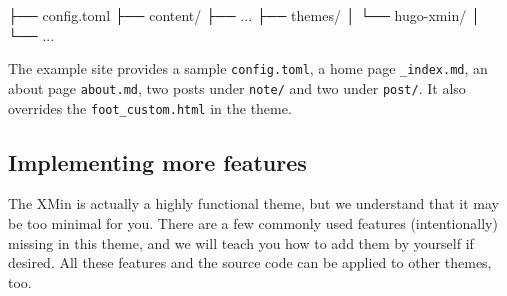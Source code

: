 \documentclass[12pt,]{krantz}
\makeatletter
\newenvironment{Shaded}{\begin{snugshade}}{\end{snugshade}}
\newcommand{\ExtensionTok}[1]{#1}
\newcommand{\NormalTok}[1]{#1}
\newenvironment{kframe}{%
\medskip{}
\setlength{\fboxsep}{.8em}
 \def\at@end@of@kframe{}%
 \ifinner\ifhmode%
  \def\at@end@of@kframe{\end{minipage}}%
  \begin{minipage}{\columnwidth}%
 \fi\fi%
 \def\FrameCommand##1{\hskip\@totalleftmargin \hskip-\fboxsep
 \colorbox{shadecolor}{##1}\hskip-\fboxsep
     \hskip-\linewidth \hskip-\@totalleftmargin \hskip\columnwidth}%
 \MakeFramed {\advance\hsize-\width
   \@totalleftmargin\z@ \linewidth\hsize
   \@setminipage}}%
 {\par\unskip\endMakeFramed%
 \at@end@of@kframe}
\renewenvironment{Shaded}{\begin{kframe}}{\end{kframe}}
\theoremstyle{definition}
\theoremstyle{definition}
\theoremstyle{definition}
\theoremstyle{remark}
\makeatother
\begin{document}
\begin{Shaded}
\begin{Highlighting}[]
\NormalTok{├── }\ExtensionTok{config.toml}
\NormalTok{├── }\ExtensionTok{content/}
\NormalTok{├── }\ExtensionTok{...}
\NormalTok{├── }\ExtensionTok{themes/}
\NormalTok{│   └── }\ExtensionTok{hugo-xmin/}
\NormalTok{│}
\NormalTok{└── }\ExtensionTok{...}
\end{Highlighting}
\end{Shaded}

The example site provides a sample \texttt{config.toml}, a home page
\texttt{\_index.md}, an about page \texttt{about.md}, two posts under
\texttt{note/} and two under \texttt{post/}. It also overrides the
\texttt{foot\_custom.html} in the theme.

\hypertarget{how-to}{%
\subsection{Implementing more features}\label{how-to}}

The XMin is actually a highly functional theme, but we understand that
it may be too minimal for you. There are a few commonly used features
(intentionally) missing in this theme, and we will teach you how to add
them by yourself if desired. All these features and the source code can
be applied to other themes, too.
\end{document}
